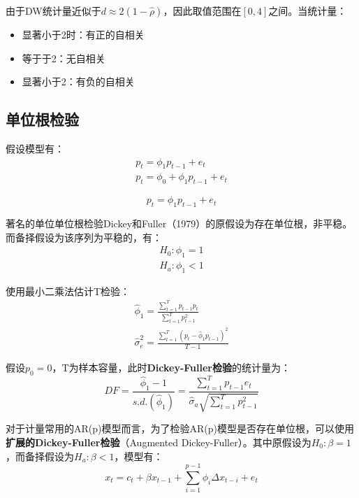 \documentclass[11pt]{article}
\begin{document}
由于DW统计量近似于$d \approx 2(1-\hat{\rho})$，因此取值范围在$[0,4]$之间。当统计量：
\begin{itemize}
    \item 显著小于2时：有正的自相关
    \item 等于于2：无自相关
    \item 显著小于2：有负的自相关
\end{itemize}

\subsection{单位根检验}

假设模型有：
\begin{gather*}
    p_t = \phi_1 p_{t-1} + e_t \\
    p_t = \phi_0 + \phi_1 p_{t-1} + e_t
\end{gather*}

\begin{equation*}
    p_t = \phi_1 p_{t-1} + e_t
\end{equation*}

著名的单位单位根检验Dickey和Fuller（1979）的原假设为存在单位根，非平稳。而备择假设为该序列为平稳的，有：
\begin{gather*}
    H_0: \phi_1 = 1 \\
    H_a: \phi_1 < 1
\end{gather*}

使用最小二乘法估计T检验：
\begin{gather*}
    \hat{\phi}_1 = \frac{\sum_{t=1}^{T} p_{t-1}p_t}{\sum_{t=1}^{T} p_{t-1}^{2}} \\
    \hat{\sigma}_{e}^{2} = \frac{\sum_{t=1}^{T} \left(p_t - \hat{\phi}_1 p_{t-1} \right)^2}{T-1}
\end{gather*}

假设$p_0=0$，T为样本容量，此时\textbf{Dickey-Fuller检验}的统计量为：
\begin{equation*}
    DF = \frac{\hat{\phi}_1 - 1}{s.d.(\hat{\phi}_1)}
    = \frac{\sum_{t=1}^{T} p_{t-1} e_t}{\hat{\sigma}_{a} \sqrt{\sum_{t=1}^{T} p_{t-1}^{2}}} 
\end{equation*}

对于计量常用的AR(p)模型而言，为了检验AR(p)模型是否存在单位根，可以使用\textbf{扩展的Dickey-Fuller检验}（Augmented Dickey-Fuller）。其中原假设为$H_0: \beta=1$，而备择假设为$H_a: \beta<1$，模型有：
\begin{equation*}
    x_t = c_t + \beta x_{t-1} + \sum_{i=1}^{p-1}\phi_i \Delta x_{t-i} + e_t
\end{equation*}
\end{document}

